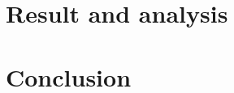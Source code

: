 \documentclass[12pt]{article}
\begin{document}
\section{Result and analysis}

\section{Conclusion}









\end{document}
